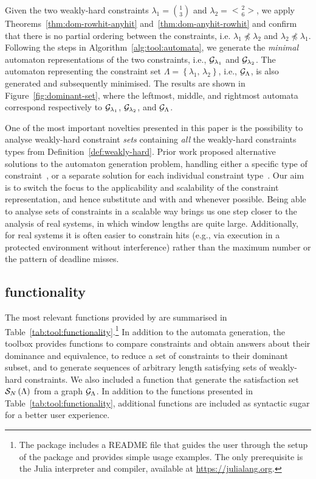 Given the two weakly-hard constraints $\lambda_1 = \binom{1}{3}$ and $\lambda_2 = \genfrac{<}{>}{0pt}{}{2}{6}$, we apply Theorems~\ref{thm:dom-rowhit-anyhit} and~\ref{thm:dom-anyhit-rowhit} and confirm that there is no partial ordering between the constraints, i.e. $\lambda_1 \npreceq \lambda_2$ and $\lambda_2 \npreceq \lambda_1$.
Following the steps in Algorithm~\ref{alg:tool:automata}, we generate the \emph{minimal} automaton representations of the two constraints, i.e., $\mathcal{G}_{\lambda_1}$ and $\mathcal{G}_{\lambda_2}$.
The automaton representing the constraint set $\Lambda = \left\{ \lambda_1,\, \lambda_2 \right\}$, i.e., $\mathcal{G}_{\Lambda}$, is also generated and subsequently minimised.
The results are shown in Figure~\ref{fig:dominant-set}, where the leftmost, middle, and rightmost automata correspond respectively to $\mathcal{G}_{\lambda_1}$, $\mathcal{G}_{\lambda_2}$, and $\mathcal{G}_{\Lambda}$.

One of the most important novelties presented in this paper is the possibility to analyse weakly-hard constraint \emph{sets} containing \emph{all} the weakly-hard constraints types from Definition~\ref{def:weakly-hard}. 
Prior work proposed alternative solutions to the automaton generation problem, handling either a specific type of constraint~\cite{Horssen:2016}, or a separate solution for each individual constraint type~\cite{Linsenmayer:2017}.
Our aim is to switch the focus to the applicability and scalability of the constraint representation, and hence substitute \tAH{} and \tAM{} with \tRH{} and \tRM{} whenever possible.
Being able to analyse sets of constraints in a scalable way brings us one step closer to the analysis of real systems, in which window lengths are quite large.
Additionally, for real systems it is often easier to constrain hits (e.g., via execution in a protected environment without interference) rather than the maximum number or the pattern of deadline misses.

\subsection{\tool{} functionality}%
\label{sec:tool:functionality}%
%

%
The most relevant functions provided by \tool{} are summarised in Table~\ref{tab:tool:functionality}.\footnote{The package includes a README file that guides the user through the setup of the package and provides simple usage examples. The only prerequisite is the Julia interpreter and compiler, available at \url{https://julialang.org}.}
In addition to the automata generation, the toolbox provides functions to compare constraints and obtain answers about their dominance and equivalence, to reduce a set of constraints to their dominant subset, and to generate sequences of arbitrary length satisfying sets of weakly-hard constraints.
We also included a function that generate the satisfaction set $\mathcal{S}_{N}\left( \Lambda \right)$ from a graph $\mathcal{G}_{\Lambda}$.
In addition to the functions presented in Table~\ref{tab:tool:functionality}, additional functions are included as syntactic sugar for a better user experience.
